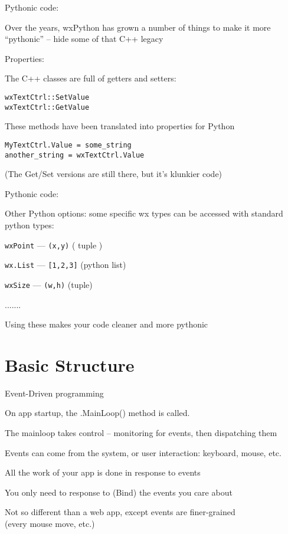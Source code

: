\documentclass{beamer}
\begin{document}
\begin{frame}[fragile]{Pythonic code:}


\vfill
{\Large Over the years, wxPython has grown a number of things to make it more ``pythonic'' -- hide some of that C++ legacy}

\vfill
{\Large Properties:}

{\large The C++ classes are full of getters and setters:}
\begin{verbatim}
wxTextCtrl::SetValue
wxTextCtrl::GetValue
\end{verbatim}

{\large These methods have been translated into properties for Python}
\begin{verbatim}
MyTextCtrl.Value = some_string
another_string = wxTextCtrl.Value
\end{verbatim}

\vfill
(The Get/Set versions are still there, but it's klunkier code)
\end{frame}

\begin{frame}[fragile]{Pythonic code:}


\vfill
{\Large Other Python options: some specific wx types can be accessed with standard python types:}

\vfill
{\large \verb`wxPoint` --- \verb`(x,y)` ( tuple ) }

\vfill
{\large \verb`wx.List` --- \verb`[1,2,3]` (python list) }

\vfill
{\large \verb`wxSize` --- \verb`(w,h)` (tuple) }

\vfill
{\large ....... }


\vfill
{\Large Using these makes your code cleaner and more pythonic}

\end{frame}

\section{Basic Structure}

\begin{frame}[fragile]{Event-Driven programming}

\vfill
{\large On app startup, the .MainLoop() method is called.}

\vfill
{\large The mainloop takes control -- monitoring for events, then dispatching them}

\vfill
{\large Events can come from the system, or user interaction: keyboard, mouse, etc.}

\vfill
{\large All the work of your app is done in response to events}

\vfill
{\large You only need to response to (Bind) the events you care about}

\vfill
{\large Not so different than a web app, except events are finer-grained}\\
(every mouse move, etc.)


\end{frame}
\end{document}
